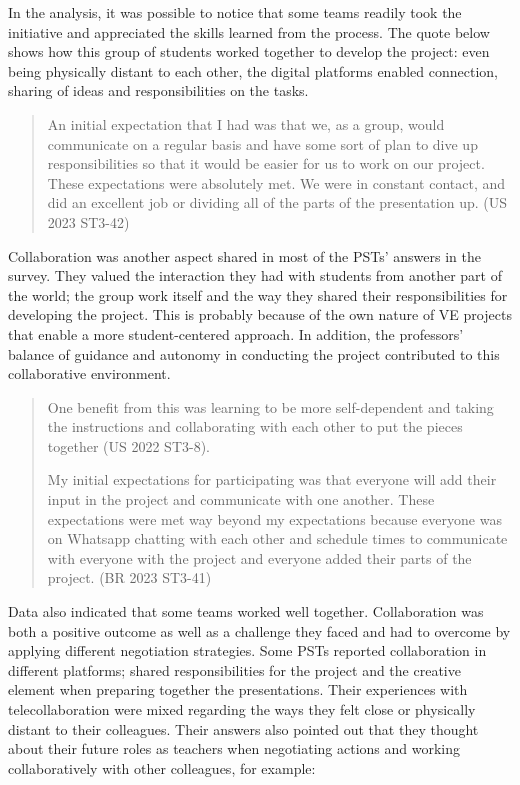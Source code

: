 In the analysis, it was possible to notice that some teams readily took
the initiative and appreciated the skills learned from the process. The
quote below shows how this group of students worked together to develop
the project: even being physically distant to each other, the digital
platforms enabled connection, sharing of ideas and responsibilities on
the tasks.

\begin{quote}
An initial expectation that I had was that we, as a group, would
communicate on a regular basis and have some sort of plan to dive up
responsibilities so that it would be easier for us to work on our
project. These expectations were absolutely met. We were in constant
contact, and did an excellent job or dividing all of the parts of the
presentation up. (US 2023 ST3-42)
\end{quote}

Collaboration was another aspect shared in most of the
PSTs' answers in the survey. They valued the
interaction they had with students from another part of the world; the
group work itself and the way they shared their responsibilities for
developing the project. This is probably because of the own nature of VE
projects that enable a more student-centered approach. In addition, the
professors' balance of guidance and autonomy in conducting the project
contributed to this collaborative environment.

\begin{quote}
One benefit from this was learning to be more self-dependent and
taking the instructions and collaborating with each other to put the
pieces together (US 2022 ST3-8).
	
My initial expectations for participating was that everyone will
add their input in the project and communicate with one another. These
expectations were met way beyond my expectations because everyone was on
Whatsapp chatting with each other and schedule times to communicate with
everyone with the project and everyone added their parts of the project.
(BR 2023 ST3-41)
\end{quote}

Data also indicated that some teams worked well together. Collaboration
was both a positive outcome as well as a challenge they faced and had to
overcome by applying different negotiation strategies. Some PSTs
reported collaboration in different platforms; shared
responsibilities for the project and the creative element when preparing
together the presentations. Their experiences with
telecollaboration were mixed regarding the ways they felt close or
physically distant to their colleagues. Their answers also pointed out
that they thought about their future roles as teachers when negotiating
actions and working collaboratively with other colleagues, for example:

